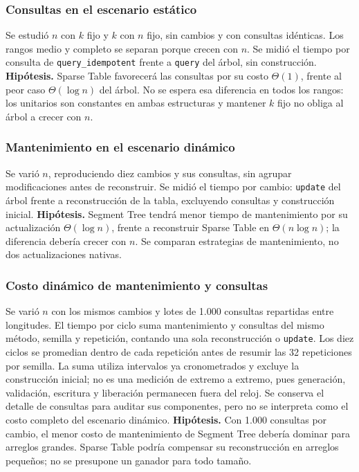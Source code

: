 \subsubsection{Consultas en el escenario estático}

Se estudió \(n\) con \(k\) fijo y \(k\) con \(n\) fijo, sin cambios y
con consultas idénticas. Los rangos medio y completo se separan porque
crecen con \(n\). Se midió el tiempo por consulta de
\texttt{query\_idempotent} frente a \texttt{query} del árbol, sin construcción.
\textbf{Hipótesis.} Sparse Table favorecerá las consultas por su costo
\(\Theta(1)\), frente al peor caso \(\Theta(\log n)\) del árbol.
No se espera esa diferencia en todos los rangos: los unitarios son constantes
en ambas estructuras y mantener \(k\) fijo no obliga al árbol a crecer con
\(n\).

\subsubsection{Mantenimiento en el escenario dinámico}

Se varió \(n\), reproduciendo diez cambios y sus consultas, sin agrupar
modificaciones antes de reconstruir. Se midió el tiempo por cambio:
\texttt{update} del árbol frente a reconstrucción de la tabla, excluyendo
consultas y construcción inicial.
\textbf{Hipótesis.} Segment Tree tendrá menor tiempo de mantenimiento por
su actualización \(\Theta(\log n)\), frente a reconstruir Sparse Table
en \(\Theta(n\log n)\); la diferencia debería crecer con \(n\).
Se comparan estrategias de mantenimiento, no dos actualizaciones nativas.

\subsubsection{Costo dinámico de mantenimiento y consultas}

Se varió \(n\) con los mismos cambios y lotes de 1.000 consultas repartidas
entre longitudes. El tiempo por ciclo suma mantenimiento y consultas del
mismo método, semilla y repetición, contando una sola reconstrucción o
\texttt{update}. Los diez ciclos se promedian dentro de cada repetición
antes de resumir las 32 repeticiones por semilla.
La suma utiliza intervalos ya cronometrados y excluye la construcción inicial;
no es una medición de extremo a extremo, pues generación, validación,
escritura y liberación permanecen fuera del reloj. Se conserva el detalle
de consultas para auditar sus componentes, pero no se interpreta como
el costo completo del escenario dinámico.
\textbf{Hipótesis.} Con 1.000 consultas por cambio, el menor costo de
mantenimiento de Segment Tree debería dominar para arreglos grandes.
Sparse Table podría compensar su reconstrucción en arreglos pequeños;
no se presupone un ganador para todo tamaño.

